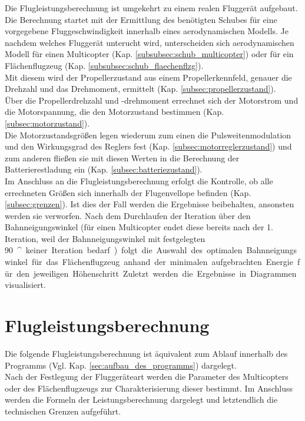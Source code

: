 Die Flugleistungsberechnung ist umgekehrt zu einem realen Fluggerät aufgebaut.
Die Berechnung startet mit der Ermittlung des benötigten Schubes für eine vorgegebene Fluggeschwindigkeit innerhalb eines aerodynamischen Modells. Je nachdem welches Fluggerät unterucht wird, unterscheiden sich aerodynamischen Modell für einen Multicopter (Kap. \ref{subsubsec:schub_multicopter}) oder für ein Flächenflugzeug (Kap. \ref{subsubsec:schub_flaechenflzg}). \\
Mit diesem wird der Propellerzustand aus einem Propellerkennfeld, genauer die Drehzahl und das Drehmoment, ermittelt (Kap. \ref{subsec:propellerzustand}). \\
Über die Propellerdrehzahl und -drehmoment errechnet sich der Motorstrom und die Motorspannung, die den Motorzustand bestimmen (Kap. \ref{subsec:motorzustand}). \\
Die Motorzustandsgrößen legen wiederum zum einen die Pulsweitenmodulation und den Wirkungsgrad des Reglers fest (Kap. \ref{subsec:motorreglerzustand}) und zum anderen fließen sie mit diesen Werten in die Berechnung der Batterierestladung ein (Kap. \ref{subsec:batteriezustand}). \\
Im Anschluss an die Flugleistungsberechnung erfolgt die Kontrolle, ob alle errechneten Größen sich innerhalb der Flugenvellope befinden (Kap. \ref{subsec:grenzen}). Ist dies der Fall werden die Ergebnisse beibehalten, ansonsten werden sie verworfen. 
Nach dem Durchlaufen der Iteration über den Bahnneigungswinkel (für einen Multicopter endet diese bereits nach der 1. Iteration, weil der Bahnneigungswinkel mit festgelegten \SI{90}{^\circ} keiner Iteration bedarf) folgt die Auswahl des optimalen Bahnneigungswinkel für das Flächenflugzeug anhand der minimalen aufgebrachten Energie für den jeweiligen Höhenschritt.
Zuletzt werden die Ergebnisse in Diagrammen visualisiert.



\section{Flugleistungsberechnung}
\label{sec:flugleistungsberechnung}
Die folgende Flugleistungsberechnung ist äquivalent zum Ablauf innerhalb des Programms (Vgl. Kap. \ref{sec:aufbau_des_programms}) dargelegt. \\
Nach der Festlegung der Fluggeräteart werden die Parameter des Multicopters oder des Flächenflugzeugs zur Charakterisierung dieser bestimmt. Im Anschluss werden die Formeln der Leistungsberechnung dargelegt und letztendlich die technischen Grenzen aufgeführt. 

